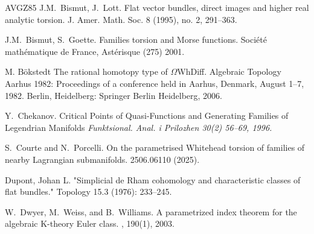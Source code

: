 \documentclass{amsart}
\def\bR{\mathbf{R}}
\theoremstyle{definition}
\theoremstyle{remark}
\newtheorem{inductive lemma}[theorem]{Inductive Lemma}
\begin{document}
\begin{thebibliography}{AVGZ85}
J.M.~Bismut, J.~Lott.
\newblock Flat vector bundles, direct images and higher real analytic
torsion.
\newblock J. Amer. Math. Soc. 8 (1995), no. 2, 291–363.

J.M.~Bismut, S.~Goette. 
\newblock Families torsion and Morse functions.
\newblock  Soci\'et\'e math\'ematique de France, Ast\'erisque (275) 2001.

M. B\"okstedt
\newblock The rational homotopy type of $\Omega$WhDiff.
\newblock Algebraic Topology Aarhus 1982: Proceedings of a conference held in Aarhus, Denmark, August 1–7, 1982. Berlin, Heidelberg: Springer Berlin Heidelberg, 2006.


Y.~Chekanov.
\newblock Critical Points of Quasi-Functions and Generating Families of Legendrian Manifolds
{\em Funktsional. Anal. i Prilozhen 30(2) 56--69, 1996.}



S.~Courte and N.~Porcelli.
\newblock On the parametrised Whitehead torsion of families of nearby Lagrangian submanifolds.
 2506.06110 (2025).




 Dupont, Johan L. "Simplicial de Rham cohomology and characteristic classes of flat bundles." Topology 15.3 (1976): 233--245.

W.~Dwyer, M.~Weiss, and B.~Williams.
\newblock A parametrized index theorem for the algebraic K-theory Euler class.
, 190(1), 2003.


  

\end{thebibliography}
\end{document}
